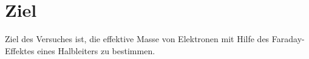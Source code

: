 \section{Ziel}
Ziel des Versuches ist, die effektive Masse von Elektronen mit Hilfe des
Faraday-Effektes eines Halbleiters zu bestimmen.
